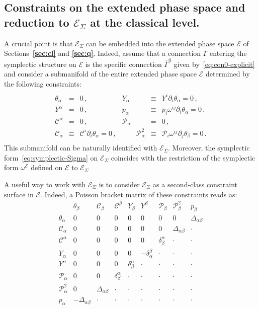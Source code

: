 \documentclass[a4paper,11pt]{amsart}
\numberwithin{thm}{section} %
\numberwithin{equation}{section} %
\numberwithin{figure}{section} %
\newcommand{\bref}[1]{{\bf \ref{#1}}}
\renewcommand{\:}{{\rm\, :\,}}
\def\bar{\overline}
\def\d{\partial}
\newcommand{\bl}{{\cdot}}
\def\cP{{\mathcal P}}
\def\cc{{\mathcal C}}
\def\E{{ \mathcal E}}
\def\con{{\bar\Gamma}}
\begin{document}
\subsection{Constraints on the extended phase space and reduction to
$\E_\Sigma$ at the classical level.}
A crucial point is that $\E_\Sigma$ can be embedded into the extended phase
space $\E$ of Sections~\bref{sec:cl} and \bref{sec:q}. Indeed,
assume that a connection $\con$ entering the symplectic structure
on $\E$ is the specific connection $\con^0$ given
by~\eqref{eq:con0-explicit} and consider a submanifold of the entire
extended phase space $\E$ determined by the following constraints:
\begin{equation}
\begin{array}{rclrcl}
&&&&&\\[-3pt]
\theta_\alpha&=&0\,, & Y_\alpha&\equiv&Y^i \d_i \theta_\alpha=0\,, \\[4pt]
Y^\alpha&=&0\,,     & p_\alpha&\equiv&p_i\omega^{ij}\d_i\theta_\alpha=0\,, \\[4pt]
\cc^\alpha&=&0\,,   & \cP_\alpha&=&0\,, \\[4pt]
\cc_\alpha&\equiv&\cc^i \d_i \theta_\alpha=0\,, & \qquad
\cP^2_\alpha&\equiv&\cP_i \omega^{ij}\d_j \theta_\beta=0\,.\\[-4pt]
&&&&&
\end{array}
\label{eq:constraints-E}
\end{equation}
This submanifold can be naturally identified with $\E_\Sigma$.
Moreover, the symplectic form~\eqref{eq:symplectic-Sigma} on
$\E_\Sigma$ coincides with the restriction of the
symplectic form $\omega^\E$ defined on $\E$ to $\E_\Sigma$ 


A useful way to work with $\E_\Sigma$ is to consider $\E_\Sigma$
as a second-class constraint surface in $\E$.
Indeed, a Poisson bracket matrix  of these constraints
reads as:
\vspace{0.5cm}
\begin{equation}
\label{eq:matrix}
  \begin{array}{l|cccccccc}
&\theta_\beta & \cc_\beta&\cc^\beta&Y_\beta&Y^\beta &\cP_\beta &\cP^2_\beta& p_\beta\\
\hline
\theta_\alpha &0&0&0&0&0&0&0&\Delta_{\alpha \beta}\\
\cc_\alpha    &0&0&0&0&0&0&\Delta_{\alpha \beta}              &\bl\\
\cc^\alpha    &0&0&0&0&0&\delta^\alpha_\beta              &\bl&\bl\\
Y_\alpha      &0&0&0&0&-\delta_\alpha^\beta            &\bl&\bl&\bl\\
Y^\alpha      &0&0&0&\delta^\alpha_\beta         &\bl&\bl&\bl&\bl\\
\cP_\alpha    &0&0&\delta^\alpha_\beta        &\bl&\bl&\bl&\bl&\bl\\
\cP^2_\alpha  &0&\Delta_{\alpha\beta}    &\bl&\bl&\bl&\bl&\bl&\bl\\
p_\alpha      &-\Delta_{\alpha\beta}  &\bl&\bl&\bl&\bl&\bl&\bl&\bl
\end{array}
\end{equation}
\vspace{0.5cm}
\end{document}
